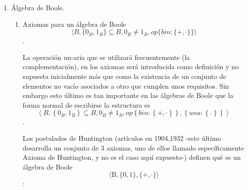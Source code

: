 \documentclass[
]{article}
\begin{document}
\begin{enumerate}
\begin{enumerate}
    que para el cuantificador univer\-sal (que evitaremos en lo posible)
    no pondremos ningún símbolo de forma que, cuando aparezca una
    variable o conjunto o constante sin haber sido cuantificada
    supondremos que se aplica el cuantificador universal a la variable o
    constante situándolo dentro de \[B\]. Si el cuantificador universal
    debiera aplicarse a una variable sobre otro conjunto subconjunto de
    \[B\] se omitirá el cuantificador universal pero se precederá la
    sentencia con una indicación sobre la pertenencia del elemento. Para
    cualquier elemento en el que no aparezca su pertenencia es porque
    pertenece al universal \[B\]. Al igual, cuando una variable que
    asuma un valor que sea un conjunto este será parte de \[\wp{(B)}\],
    no aparecerá de forma explícita. Para las variable conjunto se
    repite todo lo anterior con la diferencia de cambiar \[B\] por
    \[\wp{(B)}\]. De otro lado podemos considerar la clase propia de las
    álgebras de Boole.
  \end{enumerate}
\item
  Álgebra de Boole.

  \begin{enumerate}
  \def\labelenumii{\arabic{enumii}.}
  \item
    Axiomas para un álgebra de Boole
    \[\langle{B,{{\{{0_{B},1_{B}}\}} \subseteq B},{0_{B} \neq 1_{B}},{\mathit{op}{\{{\mathit{bin}:{\{{+ , \cdot}\}}}\}}}}\rangle\].

    La operación un-aria que se utilizará frecuentemente (la
    complementación), en los axio\-mas será introducida como definición
    y no supuesta inicialmente más que como la exis\-tencia de un
    conjunto de elementos no vacío asociados a otro que cumplen unos
    requisi\-tos. Sin embargo esto último es tan importante en las
    álgebras de Boole que la forma normal de escribirse la estructura es
    \[\left\langle {B,{\left\{ {0_{B},1_{B}} \right\} \subseteq B},{0_{B} \neq 1_{B}},{\mathit{op}\left\{ {\mathit{bin}:\left\{ {+ , \cdot} \right\}} \right\},\left\{ {\mathit{una}:\left\{ \overline{} \right\}} \right\}}} \right\rangle\].

    Los postulados de Huntington (artículos en 1904,1932 -este último
    desarrolla un con\-junto de 3 axiomas, uno de ellos llamado
    específicamente Axioma de Huntington, y no es el caso aquí
    expuesto-) definen qué es un álgebra de Boole
    \[\langle{\mathtt{\mathrm{B}},{\{{\mathtt{\mathrm{0}},\mathtt{\mathrm{1}}}\}},{\{{+ , \cdot}\}}}\rangle\]:


\end{enumerate}
\end{enumerate}
\end{document}
